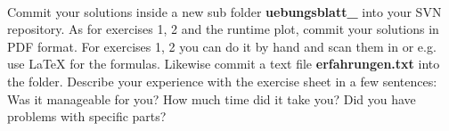 \\
Commit your solutions inside a new sub folder
\textbf{uebungsblatt\_\ExerciseSheetNumber} into your SVN repository.
As for exercises 1, 2 and the runtime plot,
commit your solutions in PDF format.
For exercises 1, 2 you can do it by hand and scan them in or e.g. use LaTeX
for the formulas.
Likewise commit a text file \textbf{erfahrungen.txt} into the folder.
Describe your experience with the exercise sheet in a few sentences:
Was it manageable for you?
How much time did it take you?
Did you have problems with specific parts?